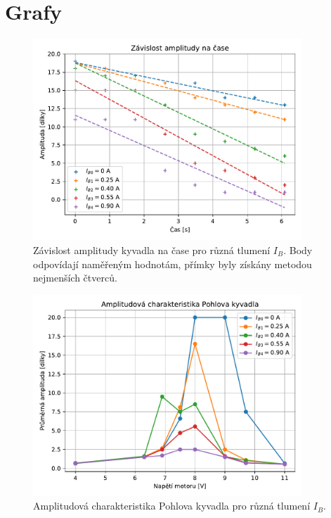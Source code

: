 \documentclass[a4paper,12pt]{article}
\begin{document}
\section{Grafy}
\begin{figure}[H]
    \centering
    \includegraphics[width=0.9\textwidth]{img/amp_cas.pdf}
    \caption{Závislost amplitudy kyvadla na čase pro různá tlumení $I_B$. Body odpovídají naměřeným hodnotám, přímky byly získány metodou nejmenších čtverců.}
    \label{fig:ampl_cas}
\end{figure}

\begin{figure}[H]
    \centering
    \includegraphics[width=0.9\textwidth]{img/amp_char.pdf}
    \caption{Amplitudová charakteristika Pohlova kyvadla pro různá tlumení $I_B$.}
    \label{fig:amp_char}
\end{figure}
\end{document}
